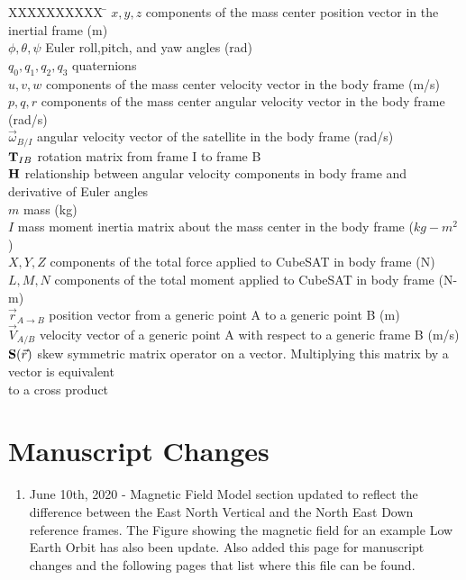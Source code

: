 \documentclass{article}
\begin{document}
\begin{tabbing}
  XXXXXXXXXX \= \kill%
  $x,y,z$ \> components of the mass center position vector in the
  inertial frame (m)  \\
  $\phi,\theta,\psi$ \> Euler roll,pitch, and yaw angles (rad) \\
  $q_0,q_1,q_2,q_3$ \>  quaternions \\  
  $u,v,w$ \> components of the mass center velocity vector in the
  body frame (m/s)  \\
  $p,q,r$ \> components of the mass center angular velocity vector in the
  body frame (rad/s)  \\
  $\vec{\omega}_{B/I}$ \> angular velocity vector of the satellite in
  the body frame (rad/s) \\
  ${\bf T}_{IB}$ \> rotation matrix from frame I to frame B \\
  ${\bf H}$ \> relationship between angular velocity components in
  body frame and derivative of Euler angles \\
  $m$ \> mass (kg) \\
  $I$ \> mass moment inertia matrix about the mass center
  in the body frame ($kg-m^2$)  \\
  $X,Y,Z$ \> components of the total force applied to CubeSAT in
  body frame (N)  \\
  $L,M,N$ \> components of the total moment applied to CubeSAT in
  body frame (N-m)  \\
  ${\vec r}_{A\rightarrow B}$ \> position vector from a generic point A
  to a generic point B (m) \\
  ${\vec V}_{A/B}$ \> velocity vector of a generic point A
  with respect to a generic frame B (m/s) \\
  ${\bf S}(\vec{r})$ \> skew symmetric matrix operator on a
  vector. Multiplying this matrix by a vector is equivalent \\
  \> to a cross product\\
\end{tabbing}

\newpage

\section*{Manuscript Changes}

\begin{enumerate}[itemsep=-5pt]
\item June 10th, 2020 - Magnetic Field Model section updated to
  reflect the difference between the East North Vertical and the North
  East Down reference frames. The Figure showing the magnetic field
  for an example Low Earth Orbit has also been update. Also added this
  page for manuscript changes and the following pages that list where
  this file can be found. 
\end{enumerate}
\end{document}
